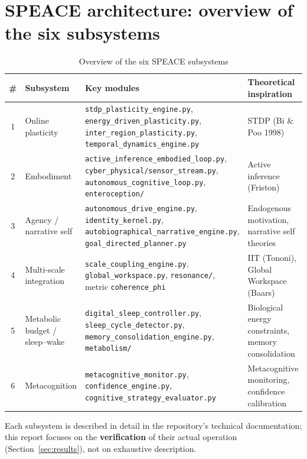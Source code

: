 \documentclass[11pt,a4paper]{article}
\newcommand{\code}[1]{\texttt{#1}}
\newcommand{\coherencephi}{\code{coherence\_phi}}
\begin{document}
\section{SPEACE architecture: overview of the six subsystems}
\label{sec:arch}

\begin{table}[h]
\centering
\caption{Overview of the six SPEACE subsystems}
\label{tab:sottosistemi}
\begin{tabular}{cp{3cm}p{5cm}p{3cm}}
\toprule
\textbf{\#} & \textbf{Subsystem} & \textbf{Key modules} & \textbf{Theoretical inspiration} \\
\midrule
1 & Online plasticity & \code{stdp\_plasticity\_engine.py}, \code{energy\_driven\_plasticity.py}, \code{inter\_region\_plasticity.py}, \code{temporal\_dynamics\_engine.py} & STDP (Bi \& Poo 1998) \\
2 & Embodiment & \code{active\_inference\_embodied\_loop.py}, \code{cyber\_physical/sensor\_stream.py}, \code{autonomous\_cognitive\_loop.py}, \code{enteroception/} & Active inference (Friston) \\
3 & Agency / narrative self & \code{autonomous\_drive\_engine.py}, \code{identity\_kernel.py}, \code{autobiographical\_narrative\_engine.py}, \code{goal\_directed\_planner.py} & Endogenous motivation, narrative self theories \\
4 & Multi-scale integration & \code{scale\_coupling\_engine.py}, \code{global\_workspace.py}, \code{resonance/}, metric \coherencephi{} & IIT (Tononi), Global Workspace (Baars) \\
5 & Metabolic budget / sleep--wake & \code{digital\_sleep\_controller.py}, \code{sleep\_cycle\_detector.py}, \code{memory\_consolidation\_engine.py}, \code{metabolism/} & Biological energy constraints, memory consolidation \\
6 & Metacognition & \code{metacognitive\_monitor.py}, \code{confidence\_engine.py}, \code{cognitive\_strategy\_evaluator.py} & Metacognitive monitoring, confidence calibration \\
\bottomrule
\end{tabular}
\end{table}

Each subsystem is described in detail in the repository's technical documentation; this report focuses on the \textbf{verification} of their actual operation (Section~\ref{sec:results}), not on exhaustive description.

\end{document}
